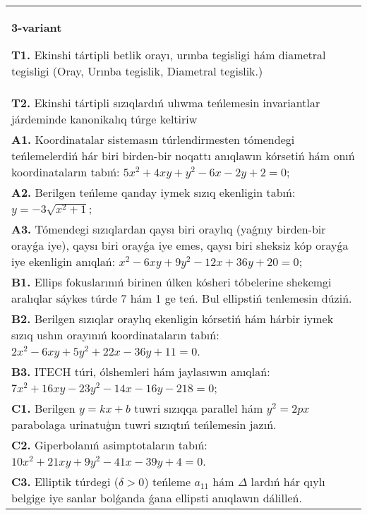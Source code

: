 \documentclass{article}
\begin{document}
\begin{tabular}{m{17cm}}
\textbf{3-variant}
\newline

\textbf{T1.} Ekinshi tártipli betlik orayı, urınba tegisligi hám diametral tegisligi (Oray, Urınba tegislik, Diametral tegislik.) \\
\textbf{T2.} Ekinshi tártipli sızıqlardıń ulıwma teńlemesin invariantlar járdeminde kanonikalıq túrge keltiriw \\
\textbf{A1.} Koordinatalar sistemasın túrlendirmesten tómendegi teńlemelerdiń hár biri birden-bir noqattı anıqlawın kórsetiń hám onıń koordinataların tabıń: $5 x^2+4 x y+y^2-6 x-2 y+2=0$; \\
\textbf{A2.} Berilgen teńleme qanday iymek sızıq ekenligin tabıń: $y=-3 \sqrt{x^2+1}$; \\
\textbf{A3.} Tómendegi sızıqlardan qaysı biri oraylıq (yaǵnıy birden-bir orayǵa iye), qaysı biri orayǵa iye emes, qaysı biri sheksiz kóp orayǵa iye ekenligin anıqlań: $x^2-6 x y+9 y^2-12 x+36 y+20=0$; \\
\textbf{B1.} Ellips fokuslarınıń birinen úlken kósheri tóbelerine shekemgi aralıqlar sáykes túrde 7 hám 1 ge teń. Bul ellipstiń tenlemesin dúziń. \\
\textbf{B2.} Berilgen sızıqlar oraylıq ekenligin kórsetiń hám hárbir iymek sızıq ushın orayınıń koordinataların tabıń: $2 x^2-6 x y+5 y^2+22 x-36 y+11=0$. \\
\textbf{B3.} ITECH túri, ólshemleri hám jaylasıwın anıqlań: $7 x^2+16 x y-23 y^2-14 x-16 y-218=0$; \\
\textbf{C1.} Berilgen $y=k x+b$ tuwri sızıqqa parallel hám $y^2=2 p x$ parabolaga urinatuģın tuwri sızıqtıń teńlemesin jazıń. \\
\textbf{C2.} Giperbolanıń asimptotaların tabıń: $10 x^2+21 x y+9 y^2-41 x-39 y+4=0$. \\
\textbf{C3.} Elliptik túrdegi ($\delta>0$) teńleme $a_{11}$ hám $\Delta$ lardıń hár qıylı belgige iye sanlar bolǵanda ǵana ellipsti anıqlawın dálilleń. \\

\end{tabular}
\vspace{1cm}
\end{document}
